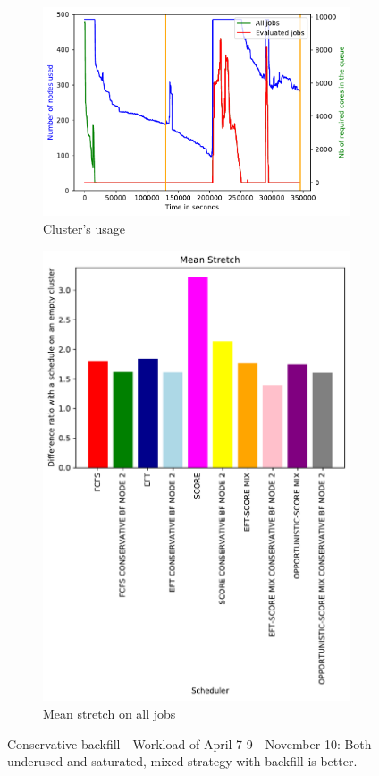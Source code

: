 \documentclass[a4paper]{article}
\begin{document}
\begin{figure}[H]\centering
\begin{subfigure}[b]{0.4\linewidth}\centering\includegraphics[width=1\linewidth]{MBSS/plot/2022-04-07->2022-04-09_V9271_Fcfs_Used_nodes_450_128_32_256_4_1024.pdf}\caption{Cluster's usage}\end{subfigure}
\begin{subfigure}[b]{0.4\linewidth}\centering\includegraphics[width=0.9\linewidth]{MBSS/plot/Results_FCFS_Score_Backfill_2022-04-07->2022-04-09_V9271_Mean_Stretch_450_128_32_256_4_1024.pdf}\caption{Mean stretch on all jobs}\end{subfigure}
\caption{Conservative backfill - Workload of April 7-9 - November 10: Both underused and saturated, mixed strategy with backfill is better.}\end{figure}
\end{document}
